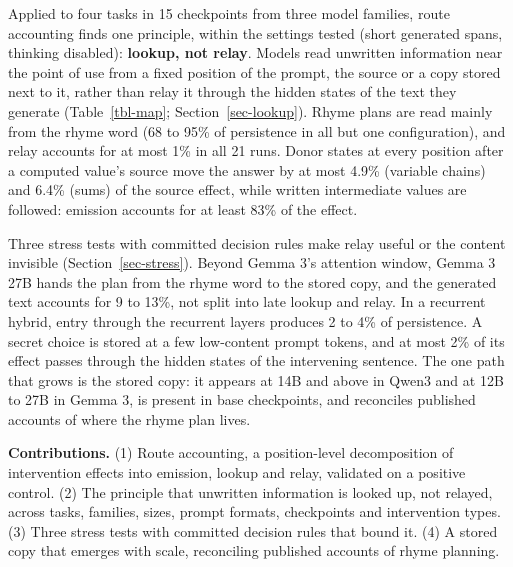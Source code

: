 \documentclass[
]{article}
\begin{document}
Applied to four tasks in 15 checkpoints from three model families, route
accounting finds one principle, within the settings tested (short
generated spans, thinking disabled): \textbf{lookup, not relay}. Models
read unwritten information near the point of use from a fixed position
of the prompt, the source or a copy stored next to it, rather than relay
it through the hidden states of the text they generate
(Table~\ref{tbl-map}; Section~\ref{sec-lookup}). Rhyme plans are read
mainly from the rhyme word (68 to 95\% of persistence in all but one
configuration), and relay accounts for at most 1\% in all 21 runs. Donor
states at every position after a computed value's source move the answer
by at most 4.9\% (variable chains) and 6.4\% (sums) of the source
effect, while written intermediate values are followed: emission
accounts for at least 83\% of the effect.

Three stress tests with committed decision rules make relay useful or
the content invisible (Section~\ref{sec-stress}). Beyond Gemma 3's
attention window, Gemma 3 27B hands the plan from the rhyme word to the
stored copy, and the generated text accounts for 9 to 13\%, not split
into late lookup and relay. In a recurrent hybrid, entry through the
recurrent layers produces 2 to 4\% of persistence. A secret choice is
stored at a few low-content prompt tokens, and at most 2\% of its effect
passes through the hidden states of the intervening sentence. The one
path that grows is the stored copy: it appears at 14B and above in Qwen3
and at 12B to 27B in Gemma 3, is present in base checkpoints, and
reconciles published accounts of where the rhyme plan lives.

\textbf{Contributions.} (1) Route accounting, a position-level
decomposition of intervention effects into emission, lookup and relay,
validated on a positive control. (2) The principle that unwritten
information is looked up, not relayed, across tasks, families, sizes,
prompt formats, checkpoints and intervention types. (3) Three stress
tests with committed decision rules that bound it. (4) A stored copy
that emerges with scale, reconciling published accounts of rhyme
planning.
\end{document}

